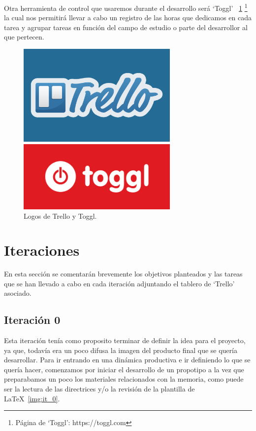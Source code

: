 Otra herramienta de control que usaremos durante el desarrollo será `Toggl'
~\ref{fig:logos} \footnote{Página de `Toggl': https://toggl.com}
la cual nos permitirá llevar a cabo un registro de las horas que dedicamos en cada tarea
y agrupar tareas en función del campo de estudio o parte del desarrollor al que pertecen.

\begin{figure}[ht]
\centering
\begin{minipage}[c]{0.45\linewidth}
	\hspace{1cm}
	\includegraphics[width=0.7\textwidth]{imagenes/metodologia/logo-trello.png}
\end{minipage}
\begin{minipage}[c]{0.45\linewidth}
	\includegraphics[width=0.7\textwidth]{imagenes/metodologia/logo-toggl.png}
\end{minipage}	
\caption{Logos de Trello y Toggl.}
\label{fig:logos}
\end{figure}

\section{Iteraciones}
En esta sección se comentarán brevemente los objetivos planteados y las tareas que
se han llevado a cabo en cada iteración adjuntando el tablero de `Trello' asociado.

\subsection{Iteración 0}
Esta iteración tenía como proposito terminar de definir la idea para el
proyecto, ya que, todavía era un poco difusa la imagen del producto final que se quería desarrollar.
Para ir entrando en una dinámica productiva e ir definiendo lo que se quería hacer,
comenzamos por iniciar el desarrollo de un propotipo a la vez que preparabamos un poco
los materiales relacionados con la memoria, como puede ser la lectura de las directrices
y/o la revisión de la plantilla de \LaTeX~\ref{img:it_0}.

